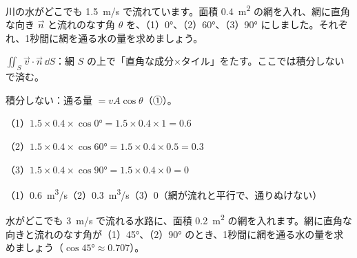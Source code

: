 

\begin{reidai}[網を通る水の量]
川の水がどこでも \qty{1.5}{m/s} で流れています。面積 \qty{0.4}{m^2} の網を入れ、網に直角な向き $\vec n$ と流れのなす角 $\theta$ を、（1）\ang{0}、（2）\ang{60}、（3）\ang{90} にしました。それぞれ、1秒間に網を通る水の量を求めましょう。\par
\kangaekata {}\par
{}\enspace $\displaystyle\iint_S\vec v\cdot\vec n\,\dd S$：網 $S$ の上で「直角な成分×タイル」をたす。ここでは積分しないで済む。\par
{}\enspace 積分しない：通る量 $=vA\cos\theta$（①）。\par
\shiki\kviiiis{}\zw{} （1）$1.5\times0.4\times\cos\ang{0}=1.5\times0.4\times1=0.6$\par
\kviiiia （2）$1.5\times0.4\times\cos\ang{60}=1.5\times0.4\times0.5=0.3$\par
\kviiiia （3）$1.5\times0.4\times\cos\ang{90}=1.5\times0.4\times0=0$\par
\kotae\kviiiis{}\zw{} （1）\qty{0.6}{m^3/s}\quad （2）\qty{0.3}{m^3/s}\quad （3）0（網が流れと平行で、通りぬけない）
\end{reidai}

\begin{jibun}
水がどこでも \qty{3}{m/s} で流れる水路に、面積 \qty{0.2}{m^2} の網を入れます。網に直角な向きと流れのなす角が（1）\ang{45}、（2）\ang{90} のとき、1秒間に網を通る水の量を求めましょう（$\cos\ang{45}\approx0.707$）。
\end{jibun}

